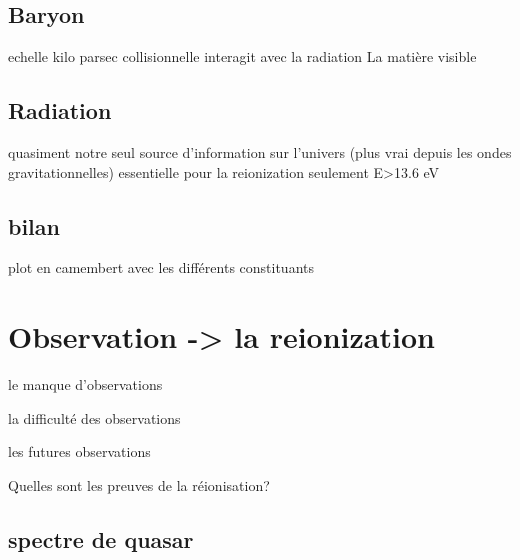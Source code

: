 \subsection{Baryon}

echelle kilo parsec
collisionnelle
interagit avec la radiation
La matière visible

\subsection{Radiation}

quasiment notre seul source d'information sur l'univers (plus vrai depuis les ondes gravitationnelles)
essentielle pour la reionization
seulement E>13.6 eV

\subsection{bilan}

plot en camembert avec les différents constituants

\section{Observation -> la reionization}

le manque d'observations

la difficulté des observations

les futures observations

Quelles sont les preuves de la réionisation?

\subsection{spectre de quasar}

